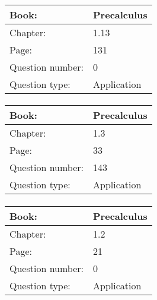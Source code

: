 \documentclass{article}
\begin{document}
            \paragraph{}
            \begin{tabularx}{1\textwidth}{
                    p{}
                    p{}
                }
                \toprule
                Book: & Precalculus
                \\
                \midrule
                Chapter: & 1.13
                \\
                \midrule
                Page: & 131
                \\
                \midrule
                Question number: & 0
                \\
                \midrule
                Question type: & Application
                \\
                \bottomrule
            \end{tabularx}
            
            \paragraph{}
            \begin{tabularx}{1\textwidth}{
                    p{}
                    p{}
                }
                \toprule
                Book: & Precalculus
                \\
                \midrule
                Chapter: & 1.3
                \\
                \midrule
                Page: & 33
                \\
                \midrule
                Question number: & 143
                \\
                \midrule
                Question type: & Application
                \\
                \bottomrule
            \end{tabularx}
            
            \paragraph{}
            \begin{tabularx}{1\textwidth}{
                    p{}
                    p{}
                }
                \toprule
                Book: & Precalculus
                \\
                \midrule
                Chapter: & 1.2
                \\
                \midrule
                Page: & 21
                \\
                \midrule
                Question number: & 0
                \\
                \midrule
                Question type: & Application
                \\
                \bottomrule
            \end{tabularx}
            
\end{document}

